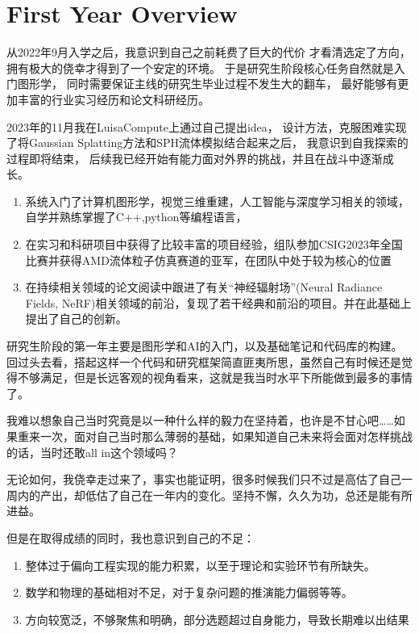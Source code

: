 \section{First Year Overview}
从2022年9月入学之后，我意识到自己之前耗费了巨大的代价
才看清选定了方向，拥有极大的侥幸才得到了一个安定的环境。
于是研究生阶段核心任务自然就是入门图形学，
同时需要保证主线的研究生毕业过程不发生大的翻车，
最好能够有更加丰富的行业实习经历和论文科研经历。

2023年的11月我在LuisaCompute上通过自己提出idea，
设计方法，克服困难实现了将Gaussian Splatting方法和SPH流体模拟结合起来之后，
我意识到自我探索的过程即将结束，
后续我已经开始有能力面对外界的挑战，并且在战斗中逐渐成长。

\begin{enumerate}
    \item 系统入门了计算机图形学，视觉三维重建，人工智能与深度学习相关的领域，自学并熟练掌握了C++,python等编程语言，
    \item 在实习和科研项目中获得了比较丰富的项目经验，组队参加CSIG2023年全国比赛并获得AMD流体粒子仿真赛道的亚军，在团队中处于较为核心的位置
    \item 在持续相关领域的论文阅读中跟进了有关“神经辐射场”(Neural Radiance Fields, NeRF)相关领域的前沿，复现了若干经典和前沿的项目。并在此基础上提出了自己的创新。
\end{enumerate}

研究生阶段的第一年主要是图形学和AI的入门，以及基础笔记和代码库的构建。回过头去看，搭起这样一个代码和研究框架简直匪夷所思，虽然自己有时候还是觉得不够满足，但是长远客观的视角看来，这就是我当时水平下所能做到最多的事情了。

我难以想象自己当时究竟是以一种什么样的毅力在坚持着，也许是不甘心吧……如果重来一次，面对自己当时那么薄弱的基础，如果知道自己未来将会面对怎样挑战的话，当时还敢all in这个领域吗？

无论如何，我侥幸走过来了，事实也能证明，很多时候我们只不过是高估了自己一周内的产出，却低估了自己在一年内的变化。坚持不懈，久久为功，总还是能有所进益。

但是在取得成绩的同时，我也意识到自己的不足：
\begin{enumerate}
    \item 整体过于偏向工程实现的能力积累，以至于理论和实验环节有所缺失。
    \item 数学和物理的基础相对不足，对于复杂问题的推演能力偏弱等等。
    \item 方向较宽泛，不够聚焦和明确，部分选题超过自身能力，导致长期难以出结果
\end{enumerate}

